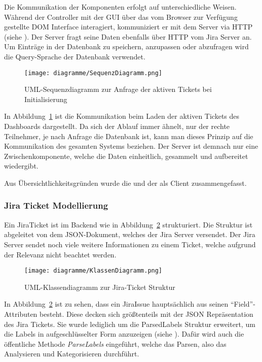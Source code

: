 Die Kommunikation der Komponenten erfolgt auf unterschiedliche Weisen. Während 
der Controller mit der GUI über das vom Browser zur Verfügung gestellte \gls{DOM}
Interface interagiert, kommuniziert er mit dem Server via \gls{HTTP} (siehe ).
Der Server fragt seine Daten ebenfalls über HTTP vom \gls{Jira} Server an. Um Einträge
in der Datenbank zu speichern, anzupassen oder abzufragen wird die Query-Sprache
der Datenbank verwendet.

\begin{figure}[H]
    \texttt{[image: diagramme/SequenzDiagramm.png]}
    \caption{UML-Sequenzdiagramm zur Anfrage der aktiven Tickets bei Initialisierung}\label{fig:sequenz}
\end{figure}

In Abbildung~\ref{fig:sequenz} ist die Kommunikation beim Laden der aktiven Tickets des Dashboards 
dargestellt. Da sich der Ablauf immer ähnelt, nur der rechte Teilnehmer, je nach 
Anfrage die Datenbank ist, kann man dieses Prinzip auf die Kommunikation des gesamten
Systems beziehen. Der Server ist demnach nur eine Zwischenkomponente, welche die
Daten einheitlich, gesammelt und aufbereitet wiedergibt.

Aus Übersichtlichkeitsgründen wurde die 
und der  als Client zusammengefasst.\\

\subsubsection{\gls{Jira} Ticket Modellierung}
Ein JiraTicket ist im Backend wie in Abbildung~\ref{fig:classes} strukturiert. Die Struktur ist abgeleitet 
von dem \gls{JSON}-Dokument, welches der \gls{Jira} Server versendet. Der \gls{Jira} Server
sendet noch viele weitere Informationen zu einem Ticket, welche aufgrund der Relevanz
nicht beachtet werden.

\begin{figure}[H]
    \texttt{[image: diagramme/KlassenDiagramm.png]}
    \caption{UML-Klassendiagramm zur Jira-Ticket Struktur}\label{fig:classes}
\end{figure}

In Abbildung~\ref{fig:classes} ist zu sehen, dass ein JiraIssue hauptsächlich aus 
seinen ``Field''-Attributen besteht. Diese decken sich größtenteils mit der 
\gls{JSON} Repräsentation des \gls{Jira} Tickets. Sie wurde lediglich um die ParsedLabels Struktur 
erweitert, um die Labels in aufgeschlüsselter Form anzuzeigen (siehe ). Dafür wird auch die
öffentliche Methode \textit{ParseLabels} eingeführt, welche das Parsen, also das
Analysieren und Kategorisieren durchführt. 

